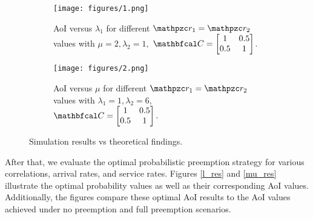 \begin{figure}[t!]
    \centering
    \begin{subfigure}[t]{0.22\textwidth}
        \centering
        \texttt{[image: figures/1.png]}
        \caption{AoI versus $\lambda_1$ for different $\np_1=\np_2$ values with $\mu=2, \lambda_2=1,$ $\bfc= \begin{bmatrix}
1 & 0.5 \\
0.5 & 1
\end{bmatrix}$.}
        \label{fig:exp1}
    \end{subfigure}
    \hfill
    \begin{subfigure}[t]{0.22\textwidth}
        \centering
        \texttt{[image: figures/2.png]}
        \caption{AoI versus $\mu$ for different $\np_1=\np_2$ values with $\lambda_1=1, \lambda_2=6,$ $\bfc= \begin{bmatrix}
1 & 0.5 \\
0.5 & 1
\end{bmatrix}.$}
        \label{fig:exp2}
    \end{subfigure}
    \caption{Simulation results vs theoretical findings.}
    \vspace{-14pt}
    \label{fig:exp_res}
\end{figure}




After that, we evaluate the optimal probabilistic preemption strategy for various correlations, arrival rates, and service rates. Figures \ref{l_res} and \ref{mu_res} illustrate the optimal probability values as well as their corresponding AoI values.  Additionally, the figures compare these optimal AoI results to the AoI values achieved under no preemption and full preemption scenarios. 



